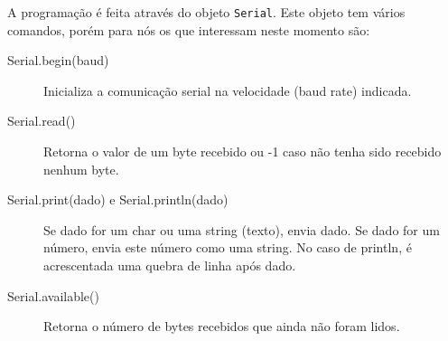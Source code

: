 A programação é feita através do objeto  \lstinline|Serial|. Este objeto tem vários comandos, porém para nós os que interessam neste momento são:
\begin{description}
	\item[Serial.begin(baud)] Inicializa a comunicação serial na velocidade (baud rate) indicada.
	\item[Serial.read()] Retorna o valor de um byte recebido ou -1 caso não tenha sido recebido nenhum byte.
	\item[Serial.print(dado) e Serial.println(dado)] Se dado for um char ou uma string (texto), envia dado. Se dado for um número, envia este número como uma string. No caso de println, é acrescentada uma quebra de linha após dado.
	\item[Serial.available()] Retorna o número de bytes recebidos que ainda não foram lidos.
\end{description}


